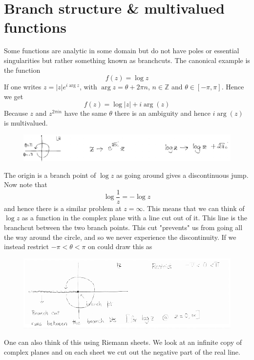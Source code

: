 \documentclass[a4paper,12pt]{article}
\begin{document}
\section{Branch structure \& multivalued functions}
Some functions are analytic in some domain but do not have poles or essential singularities but rather something known as branchcuts. The canonical example is the function
\begin{equation}
f(z)=\log z
\end{equation}
If one writes $z=|z|e^{i\arg z}$, with $\arg z=\theta +2\pi n$,  $n\in \mathds Z$ and $\theta \in [-\pi,\pi]$. Hence we get
\begin{equation}
	f(z)=\log |z|+i\arg(z)
\end{equation}
Because $z$ and $z^{2\pi i n}$ have the same $\theta$ there is an ambiguity and hence $i\arg(z)$ is multivalued.
\begin{figure}[H]
	\centering
	\includegraphics[width=0.9\linewidth]{12}
	\caption{}
	\label{fig:4}
\end{figure}
The origin is a branch point of $\log z$ as going around gives a discontinuous jump. Now note that
\begin{equation}
\log \frac{1}{z}=-\log z
\end{equation}
and hence there is a similar problem at $z=\infty$. This means that we can think of $\log z$ as a function in the complex plane with a line cut out of it. This line is the branchcut between the two branch points. This cut "prevents" us from going all the way around the circle, and so we never experience the discontinuity. If we instead restrict $-\pi <\theta<\pi $ on could draw this as
\begin{figure}[H]
	\centering
	\includegraphics[width=0.9\linewidth]{13}
	\caption{}
	\label{fig:4}
\end{figure}
One can also think of this using Riemann sheets. We look at an infinite copy of complex planes and on each sheet we cut out the negative part of the real line.
\end{document}
